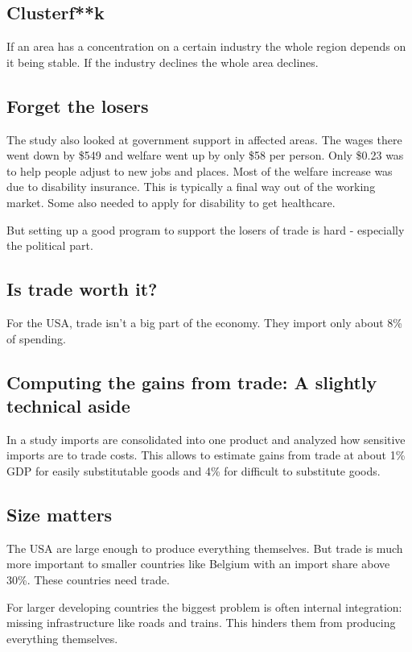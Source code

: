 \documentclass[a4paper, twocolumn]{article}
\begin{document}
\subsection{Clusterf**k}
If an area has a concentration on a certain industry the whole region depends on it being stable. If the industry declines the whole area declines.

\subsection{Forget the losers}
The study \cite{china-syndrome} also looked at government support in affected areas. The wages there went down by \$549 and welfare went up by only \$58 per person. Only \$0.23 was to help people adjust to new jobs and places. Most of the welfare increase was due to disability insurance. This is typically a final way out of the working market. Some also needed to apply for disability to get healthcare.

But setting up a good program to support the losers of trade is hard - especially the political part. 

\subsection{Is trade worth it?}
For the USA, trade isn't a big part of the economy. They import only about 8\% of spending.

\subsection{Computing the gains from trade: A slightly technical aside}
In a study \cite{predictions-of-trade} imports are consolidated into one product and analyzed how sensitive imports are to trade costs. This allows to estimate gains from trade at about 1\% GDP for easily substitutable goods and 4\% for difficult to substitute goods. 

\subsection{Size matters}
The USA are large enough to produce everything themselves. But trade is much more important to smaller countries like Belgium with an import share above 30\%. These countries need trade.

For larger developing countries the biggest problem is often internal integration: missing infrastructure like roads and trains. This hinders them from producing everything themselves. 
\end{document}
